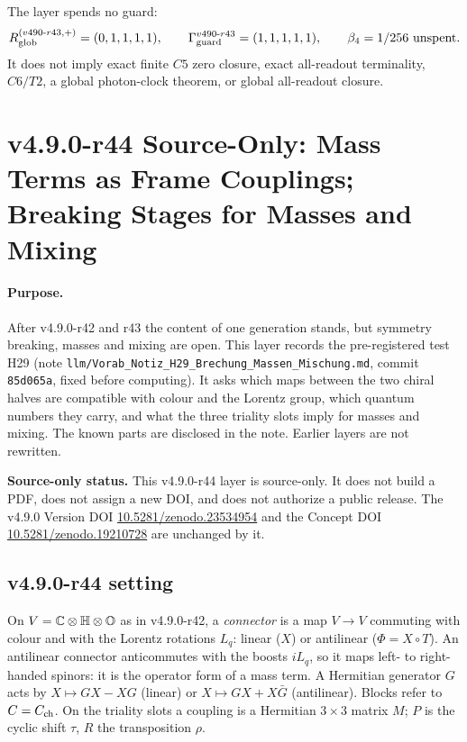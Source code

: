 The layer spends no guard:
\[
R_{\rm glob}^{(v490\text{-}r43,+)}=(0,1,1,1,1),
\qquad
\Gamma_{\rm guard}^{v490\text{-}r43}=(1,1,1,1,1),
\qquad
\beta_4=1/256\ \text{unspent}.
\]
It does not imply exact finite \(C5\) zero closure, exact all-readout terminality,
\(C6/T2\), a global photon-clock theorem, or global all-readout closure.
\clearpage
\section*{v4.9.0-r44 Source-Only: Mass Terms as Frame Couplings; Breaking Stages for Masses and Mixing}
\label{sec:v490-r44-mass-frame-couplings}

\paragraph{Purpose.}
After v4.9.0-r42 and r43 the content of one generation stands, but symmetry breaking, masses and mixing are open.  This layer records the
pre-registered test H29 (note \texttt{llm/Vorab\_Notiz\_H29\_Brechung\_Massen\_Mischung.md}, commit \texttt{85d065a}, fixed before
computing).  It asks which maps between the two chiral halves are compatible with colour and the Lorentz group, which quantum numbers they
carry, and what the three triality slots imply for masses and mixing.  The known parts are disclosed in the note.  Earlier layers are not
rewritten.

\noindent\textbf{Source-only status.}
This v4.9.0-r44 layer is source-only.  It does not build a PDF, does not assign a new DOI,
and does not authorize a public release.  The v4.9.0 Version DOI
\href{https://doi.org/10.5281/zenodo.23534954}{10.5281/zenodo.23534954} and the Concept DOI
\href{https://doi.org/10.5281/zenodo.19210728}{10.5281/zenodo.19210728} are unchanged by it.

\subsection*{v4.9.0-r44 setting}
\label{subsec:v490-r44-setting}

On \(V=\mathbb C\otimes\mathbb{H}\otimes\mathbb{O}\) as in v4.9.0-r42, a \emph{connector} is a map \(V\to V\) commuting with colour and with the Lorentz
rotations \(L_q\): linear (\(X\)) or antilinear (\(\Phi=X\circ T\)).  An antilinear connector anticommutes with the boosts \(iL_q\), so it maps
left- to right-handed spinors: it is the operator form of a mass term.  A Hermitian generator \(G\) acts by \(X\mapsto GX-XG\) (linear) or
\(X\mapsto GX+X\bar G\) (antilinear).  Blocks refer to \(C=C_{\rm ch}\).  On the triality slots a coupling is a Hermitian \(3\times3\) matrix
\(M\); \(P\) is the cyclic shift \(\tau\), \(R\) the transposition \(\rho\).

